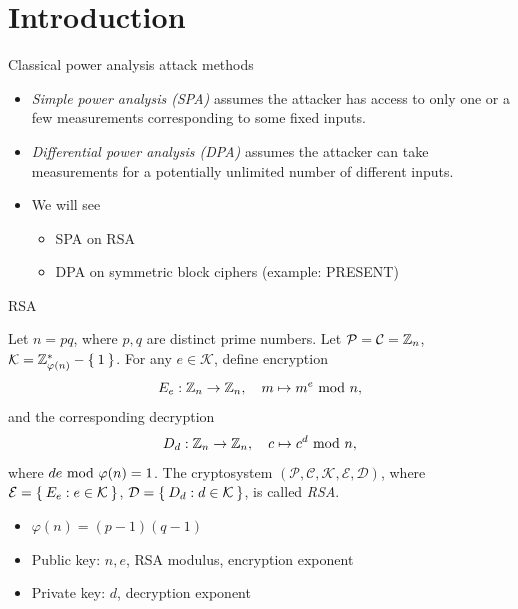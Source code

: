 \section{Introduction}
\begin{frame}{\VideoName}
    \tableofcontents[currentsection]
\end{frame}

\begin{frame}{Classical power analysis attack methods}
    \begin{itemize}
        \item \textit{Simple power analysis (SPA)} assumes the attacker has access to only one or a few measurements corresponding to some fixed inputs.
        \item \textit{Differential power analysis (DPA)} assumes the attacker can take measurements for a potentially unlimited number of different inputs.
       \item We will see
       \begin{itemize}
           \item SPA on RSA
           \item DPA on symmetric block ciphers (example: PRESENT)
       \end{itemize}
    \end{itemize}
\end{frame}

\begin{frame}{RSA}
\begin{definition}[RSA]
Let $n=pq$, where $p,q$ are distinct prime numbers.
Let $\mathcal{P}=\mathcal{C}={\mathbb Z}_n$, $\mathcal{K}={\mathbb Z}_{\varphi(n)}^*-\Set{1}$.
For any $e\in \mathcal{K}$, define encryption
\[
    E_e:{\mathbb Z}_n\to{\mathbb Z}_n,\quad m\mapsto m^e\textrm{~mod~} n,
\]
and the corresponding decryption
\[
    D_d:{\mathbb Z}_n\to{\mathbb Z}_n,\quad c\mapsto c^d\textrm{~mod~} n,
\]
where $de\textrm{~mod~}\varphi(n)=1$.
The cryptosystem $(\mathcal{P},\mathcal{C},\mathcal{K},\mathcal{E},\mathcal{D})$, where $\mathcal{E}=\Set{E_e:e\in\mathcal{K}}$, $\mathcal{D}=\Set{D_d:d\in\mathcal{K}}$, is called \textit{RSA}.
\end{definition}
\begin{itemize}
    \item $\varphi(n)=(p-1)(q-1)$
    \item Public key: $n,e$, RSA modulus, encryption exponent
    \item Private key: $d$, decryption exponent
\end{itemize}
\end{frame}


